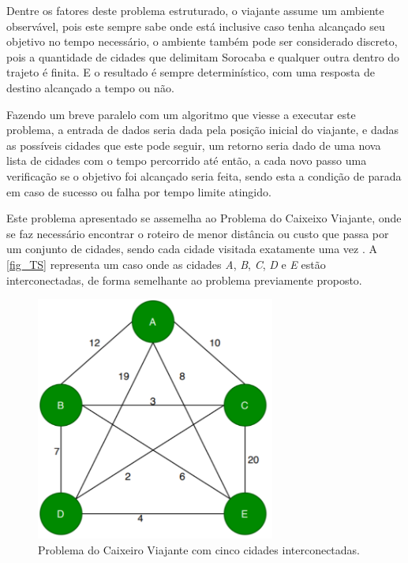 Dentre os fatores deste problema estruturado, o viajante assume um
ambiente observável, pois este sempre sabe onde está inclusive caso
tenha alcançado seu objetivo no tempo necessário, o ambiente também
pode ser considerado discreto, pois a quantidade de cidades que
delimitam Sorocaba e qualquer outra dentro do trajeto é finita. E o
resultado é sempre determinístico, com uma resposta de destino
alcançado a tempo ou não.

Fazendo um breve paralelo com um algoritmo que viesse a executar este
problema, a entrada de dados seria dada pela posição inicial do
viajante, e dadas as possíveis cidades que este pode seguir, um
retorno seria dado de uma nova lista de cidades com o tempo percorrido
até então, a cada novo passo uma verificação se o objetivo foi
alcançado seria feita, sendo esta a condição de parada em caso de
sucesso ou falha por tempo limite atingido.

Este problema apresentado se assemelha ao Problema do Caixeixo Viajante,
onde se faz necessário encontrar o roteiro de menor distância ou custo
que passa por um conjunto de cidades, sendo cada cidade visitada exatamente
uma vez \cite{cunha2002abrahao}. A \autoref{fig_TS} representa um caso
onde as cidades \textit{A}, \textit{B}, \textit{C}, \textit{D} e \textit{E} estão
interconectadas, de forma semelhante ao problema previamente proposto.

\begin{figure}[htb]
    \centering
    \caption{\label{fig_TS}Problema do Caixeiro Viajante com cinco cidades interconectadas.}
    \includegraphics[width=0.7\textwidth]{images/TS.PNG}
\end{figure}

